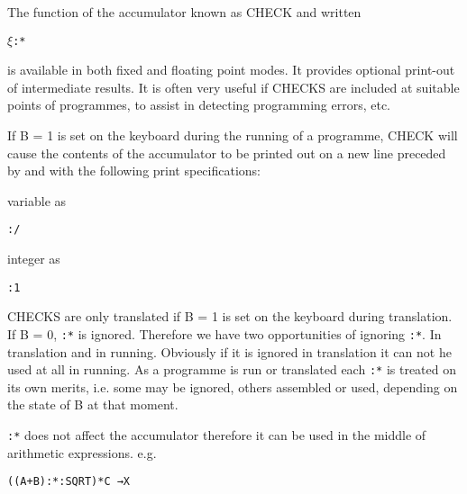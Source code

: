 \documentclass[10pt, a4paper, oneside]{article}
\newcommand{\mytt}[1]{\texttt{\scriptsize #1}}
\newcommand{\mytt}[1]{\texttt{\small #1}}
\begin{document}
\begin{multicols}{2}
The function of the accumulator known as CHECK
and written

\begin{addmargin}[1cm]{1em}%
\vspace{0.2cm}
\hspace{0.4cm}$\xi$\mytt{:*} \\
\end{addmargin}

is available in both fixed and floating point modes.
It provides optional print-out of intermediate results.
It is often very useful if CHECKS are included at
suitable points of programmes, to assist in detecting
programming errors, etc.

If B = 1 is set on the keyboard during the running
of a programme, CHECK will cause the contents of the
accumulator to be printed out on a new line preceded
by \mytt{*} and with the following print specifications:

variable as

\begin{addmargin}[1cm]{1em}%
\vspace{0.2cm}
\hspace{0.4cm}\mytt{:/} \\
\end{addmargin}

integer as

\begin{addmargin}[1cm]{1em}%
\vspace{0.2cm}
\hspace{0.4cm}\mytt{:1} \\
\end{addmargin}


CHECKS are only translated if B = 1 is set on
the keyboard during translation.  If B = 0, \mytt{:*} is
ignored.  Therefore we have two opportunities of
ignoring \mytt{:*}.  In translation and in running.  Obviously
if it is ignored in translation it can not he used at
all in running.  As a programme is run or translated
each \mytt{:*} is treated on its own merits, i.e. some may
be ignored, others assembled or used, depending on the
state of B at that moment.

\mytt{:*} does not affect the accumulator therefore it
can be used in the middle of arithmetic expressions.
e.g.

\begin{addmargin}[1cm]{1em}%
\begin{lstlisting}
((A+B):*:SQRT)*C →X
\end{lstlisting}
\end{addmargin}



\end{multicols}
\end{document}
